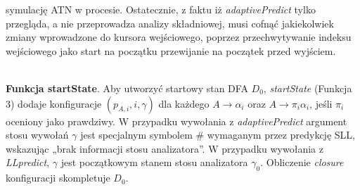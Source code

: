 symulację ATN w procesie.
Ostatecznie, z faktu iż \textit{adaptivePredict} tylko przegląda, a nie przeprowadza analizy składniowej,
musi cofnąć jakiekolwiek zmiany wprowadzone do kursora wejściowego,
poprzez przechwytywanie indeksu wejściowego jako start na początku przewijanie na początek przed wyjściem.
\\
 \\
\par
\textbf{Funkcja startState}. Aby utworzyć startowy stan DFA $D_0$,
\textit{startState} (Funkcja 3) dodaje konfiguracje $(p_{A,i}, i, \gamma)$
dla każdego $A \rightarrow \alpha_i$ oraz $A \rightarrow \pi_i \alpha_i$,
jeśli $\pi_i$ oceniony jako prawdziwy.
W przypadku wywołania z \textit{adaptivePredict} argument stosu wywołań $\gamma$
jest specjalnym symbolem \# wymaganym przez predykcję SLL, wskazując „brak informacji stosu analizatora”.
W przypadku wywołania z \textit{LLpredict}, $\gamma$ jest początkowym stanem stosu
analizatora $\gamma_0$.
Obliczenie \textit{closure} konfiguracji skompletuje $D_0$.
\\
 \\
